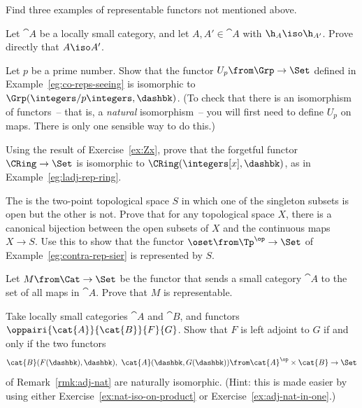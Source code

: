 \exs


\begin{question}
Find three examples of representable functors not mentioned above.
\end{question}


\begin{question}        
\label{ex:yoneda-conservative}
Let $\cat{A}$ be a locally small category, and let $A, A' \in \cat{A}$ with
$\h_A \iso \h_{A'}$.  Prove directly that $A \iso A'$.
\end{question}


\begin{question}        
\label{ex:cyclic-rep}
Let $p$ be a prime number.  Show that the functor $U_p\from \Grp \to \Set$
defined in Example~\ref{eg:co-reps-seeing} is isomorphic to
$\Grp(\integers/p\integers, \dashbk)$.  (To check that there is an
isomorphism of functors~-- that is, a \emph{natural} isomorphism~-- you
will first need to define $U_p$ on maps.  There is only one sensible way to
do this.)
\end{question}


\begin{question}        
\label{ex:free-ring-one-gen}
Using the result of Exercise~\ref{ex:Zx}, prove that the
forgetful functor $\CRing \to \Set$ is isomorphic to $\CRing(\integers[x],
\dashbk)$, as in Example~\ref{eg:ladj-rep-ring}.
\end{question}


\begin{question}        
\label{ex:sierpinski-space}
The  is the two-point topological space $S$ in
which one of the singleton subsets is open but the other is not.  Prove
that for any topological space $X$, there is a canonical bijection between
the open subsets of $X$ and the continuous maps $X \to S$.  Use this to
show that the functor $\oset\from \Tp^\op \to \Set$ of
Example~\ref{eg:contra-rep-sier} is represented by $S$.
\end{question}


\begin{question}        
\label{ex:arrows-rep}
Let $M \from \Cat \to \Set$ be the functor that sends a small category
$\cat{A}$ to the set of all maps in $\cat{A}$.  Prove that $M$ is
representable.
\end{question}


\begin{question}        
\label{ex:adj-nat}
Take locally small categories $\cat{A}$ and $\cat{B}$, and functors
$\oppairi{\cat{A}}{\cat{B}}{F}{G}$.  Show that $F$ is left adjoint to $G$
if and only if the two functors 
\[
\cat{B}(F(\dashbk), \dashbk), 
\ 
\cat{A}(\dashbk, G(\dashbk))
\from
\cat{A}^\op \times \cat{B} \to \Set
\]
of Remark~\ref{rmk:adj-nat} are naturally isomorphic.  (Hint: this
  is made easier by using either Exercise~\ref{ex:nat-iso-on-product} or
  Exercise~\ref{ex:adj-nat-in-one}.)
\end{question}



